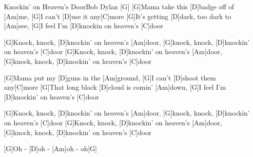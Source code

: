 \documentclass[../main.tex]{subfiles}
\begin{document}
\begin{songwithoutpagebreak}{Knockin' on Heaven's Door}{Bob Dylan}{}
[G] \hh[D] \hh[Am] \hh[G] \hh[D] \hh[C]{}
[G]Mama take this [D]badge off of [Am]me, [G]I can't [D]use it any[C]more
[G]It's getting [D]dark, too dark to [Am]see, [G]I feel I'm [D]knockin on heaven's [C]door

[G]Knock, knock, [D]knockin' on heaven's [Am]door, [G]knock, knock, [D]knockin' on heaven's [C]door
[G]Knock, knock, [D]knockin' on heaven's [Am]door, [G]knock, knock, [D]knockin' on heaven's [C]door

[G]Mama put my [D]guns in the [Am]ground, [G]I can't [D]shoot them any[C]more
[G]That long black [D]cloud is comin' [Am]down, [G]I feel I'm [D]knockin' on heaven's [C]door

[G]Knock, knock, [D]knockin' on heaven's [Am]door, [G]knock, knock, [D]knockin' on heaven's [C]door
[G]Knock, knock, [D]knockin' on heaven's [Am]door, [G]knock, knock, [D]knockin' on heaven's [C]door

[G]Oh - [D]oh - [Am]oh - oh[G]{\hh}

\end{songwithoutpagebreak}
\end{document}
